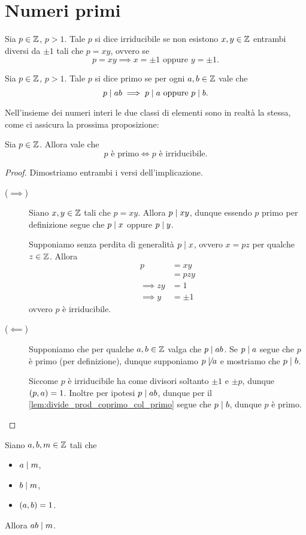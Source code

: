 \section{Numeri primi}

\begin{definition}
    [Irreducibile]
    Sia $p \in \mathbb{Z}$, $p > 1$. Tale $p$ si dice irriducibile se non esistono $x, y \in \mathbb{Z}$ entrambi diversi da $\pm 1$ tali che $p = xy$, ovvero se \begin{equation}
        p = xy \implies x = \pm 1 \text{ oppure } y = \pm 1.
    \end{equation}
\end{definition}

\begin{definition}
    [Primo]
    Sia $p \in \mathbb{Z}$, $p > 1$. Tale $p$ si dice primo se per ogni $a, b \in \mathbb{Z}$ vale che \begin{equation}
        p \mid ab \implies p \mid a \text{ oppure } p \mid b.
    \end{equation}
\end{definition}

Nell'insieme dei numeri interi le due classi di elementi sono in realtà la stessa, come ci assicura la prossima proposizione:
\begin{proposition}
     Sia $p \in \mathbb{Z}$. Allora vale che \[
        p \text{ è primo} \iff p \text{ è irriducibile.}    
    \]
\end{proposition}
\begin{proof}
    Dimostriamo entrambi i versi dell'implicazione.
    \begin{description}
        \item[($\implies$)] Siano $x, y \in \mathbb{Z}$ tali che $p = xy$. Allora $p \mid xy$, dunque essendo $p$ primo per definizione segue che $p \mid x$ oppure $p \mid y$.
        
        Supponiamo senza perdita di generalità $p \mid x$, ovvero $x = pz$ per qualche $z \in \mathbb{Z}$. Allora \begin{align*}
            p &= xy \\
            &= pzy \\
            \implies zy &= 1 \\
            \implies y &= \pm 1
        \end{align*} ovvero $p$ è irriducibile.
        \item[($\impliedby$)] Supponiamo che per qualche $a, b \in \mathbb{Z}$ valga che $p \mid ab$. Se $p \mid a$ segue che $p$ è primo (per definizione), dunque supponiamo $p \not\mid a$ e mostriamo che $p \mid b$.
        
        Siccome $p$ è irriducibile ha come divisori soltanto $\pm 1$ e $\pm p$, dunque $\left(p, a\right) = 1$. Inoltre per ipotesi $p \mid ab$, dunque per il \autoref{lem:divide_prod_coprimo_col_primo} segue che $p \mid b$, dunque $p$ è primo.
    \end{description}
\end{proof}

\begin{lemma}
    Siano $a, b, m \in \mathbb{Z}$ tali che \begin{itemize}
        \item $a \mid m$,
        \item $b \mid m$,
        \item $\left(a, b\right) = 1$.
    \end{itemize}
    Allora $ab \mid m$.
\end{lemma}